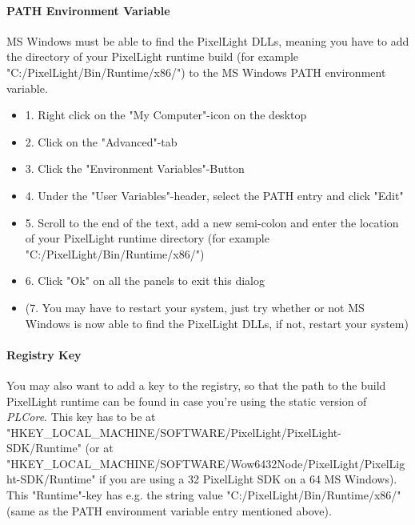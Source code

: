 \paragraph{PATH Environment Variable}
MS Windows must be able to find the PixelLight \ac{DLL}s, meaning you have to add the directory of your PixelLight runtime build (for example "C:/PixelLight/Bin/Runtime/x86/") to the MS Windows PATH environment variable.
\begin{itemize}
\item{1. Right click on the "My Computer"-icon on the desktop}
\item{2. Click on the "Advanced"-tab}
\item{3. Click the "Environment Variables"-Button}
\item{4. Under the "User Variables"-header, select the PATH entry and click "Edit"}
\item{5. Scroll to the end of the text, add a new semi-colon and enter the location of your PixelLight runtime directory (for example "C:/PixelLight/Bin/Runtime/x86/")}
\item{6. Click "Ok" on all the panels to exit this dialog}
\item{(7. You may have to restart your system, just try whether or not MS Windows is now able to find the PixelLight \ac{DLL}s, if not, restart your system)}
\end{itemize}


\paragraph{Registry Key}
You may also want to add a key to the registry, so that the path to the build PixelLight runtime can be found in case you're using the static version of \emph{PLCore}. This key has to be at "HKEY\_LOCAL\_MACHINE/SOFTWARE/PixelLight/PixelLight-SDK/Runtime" (or at "HKEY\_LOCAL\_MACHINE/SOFTWARE/Wow6432Node/PixelLight/PixelLight-SDK/Runtime" if you are using a \SI{32}{\bit} PixelLight SDK on a \SI{64}{\bit} MS Windows). This "Runtime"-key has e.g. the string value "C:/PixelLight/Bin/Runtime/x86/" (same as the PATH environment variable entry mentioned above).
